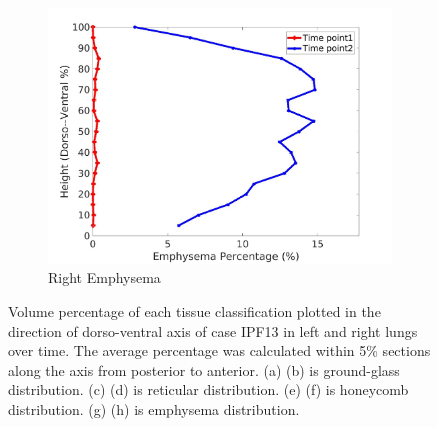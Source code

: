 \begin{figure}[H]
\begin{subfigure}{.42\linewidth}
  \includegraphics[width=\linewidth,trim={{.0\wd0} {.0\wd0} {.0\wd0} {.0\wd0}},clip]{Appendix/Image_AppexA/DorsoToVentral/IPF13RightLungEmphysemaDiseaseDorsoToVentral.jpg}
  \caption{Right Emphysema}
  \label{fig:IPF13DiseaseDorsoToVentral-h}
\end{subfigure}
\caption{Volume percentage of each tissue classification plotted in the direction of dorso-ventral axis of case IPF13 in left and right lungs over time. The average percentage was calculated within 5\% sections along the axis from posterior to anterior. (a) (b) is ground-glass distribution. (c) (d) is reticular distribution. (e) (f) is honeycomb distribution. (g) (h) is emphysema distribution.}
\label{fig:IPF13DiseaseDorsoToVentral}
\end{figure}

